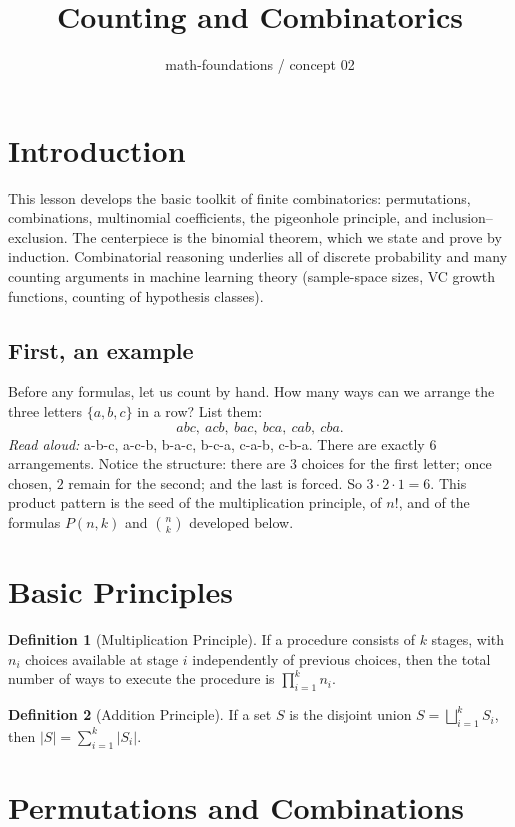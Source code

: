 \documentclass[11pt]{article}
\title{Counting and Combinatorics}
\author{math-foundations / concept 02}
\date{}
\theoremstyle{definition}
\newtheorem{definition}{Definition}
\theoremstyle{remark}
\begin{document}
\maketitle

\section*{Introduction}

This lesson develops the basic toolkit of finite combinatorics:
permutations, combinations, multinomial coefficients, the pigeonhole
principle, and inclusion--exclusion. The centerpiece is the binomial
theorem, which we state and prove by induction. Combinatorial reasoning
underlies all of discrete probability and many counting arguments in
machine learning theory (sample-space sizes, VC growth functions,
counting of hypothesis classes).

\subsection*{First, an example}
Before any formulas, let us count by hand. How many ways can we arrange
the three letters $\{a, b, c\}$ in a row? List them:
\[
  abc,\ acb,\ bac,\ bca,\ cab,\ cba.
\]
\emph{Read aloud:} a-b-c, a-c-b, b-a-c, b-c-a, c-a-b, c-b-a.
There are exactly $6$ arrangements. Notice the structure: there are $3$
choices for the first letter; once chosen, $2$ remain for the second; and
the last is forced. So $3 \cdot 2 \cdot 1 = 6$. This product pattern is
the seed of the multiplication principle, of $n!$, and of the formulas
$P(n,k)$ and $\binom{n}{k}$ developed below.

\section*{Basic Principles}

\begin{definition}[Multiplication Principle]
If a procedure consists of $k$ stages, with $n_i$ choices available at
stage $i$ independently of previous choices, then the total number of
ways to execute the procedure is $\prod_{i=1}^k n_i$.
\end{definition}

\begin{definition}[Addition Principle]
If a set $S$ is the disjoint union $S = \bigsqcup_{i=1}^k S_i$, then
$|S| = \sum_{i=1}^k |S_i|$.
\end{definition}

\section*{Permutations and Combinations}
\end{document}
